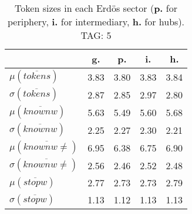 \begin{table}[h!]
\begin{center}
\begin{tabular}{| l | c | c | c | c |}\hline
 & g. & p. & i. & h. \\\hline
$\mu(\overline{tokens})$ & 3.83  & 3.80  & 3.83  & 3.84 \\\hline
$\sigma(\overline{tokens})$ & 2.87  & 2.85  & 2.97  & 2.80 \\\hline
$\mu(\overline{knownw})$ & 5.63  & 5.49  & 5.60  & 5.68 \\\hline
$\sigma(\overline{knownw})$ & 2.25  & 2.27  & 2.30  & 2.21 \\\hline
$\mu(\overline{knownw \neq})$ & 6.95  & 6.38  & 6.75  & 6.90 \\\hline
$\sigma(\overline{knownw \neq})$ & 2.56  & 2.46  & 2.52  & 2.48 \\\hline
$\mu(\overline{stopw})$ & 2.77  & 2.73  & 2.73  & 2.79 \\\hline
$\sigma(\overline{stopw})$ & 1.13  & 1.12  & 1.13  & 1.13 \\\hline
\end{tabular}
\caption{Token sizes in each Erd\"os sector ({{\bf p.}} for periphery, {{\bf i.}} for intermediary, {{\bf h.}} for hubs). TAG: 5}
\end{center}
\end{table}